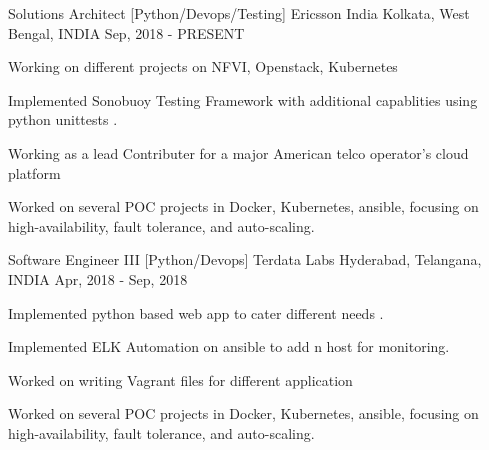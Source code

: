

\begin{cventries}

    \cventry
    {Solutions Architect [Python/Devops/Testing]} %
    {Ericsson India} %
    {Kolkata, West Bengal, INDIA} %
    {Sep, 2018 - PRESENT} %
    {
      \begin{cvitems} %
        \item {Working on different projects on NFVI, Openstack, Kubernetes}
        \item {Implemented Sonobuoy Testing Framework with additional capablities using python unittests .}
        \item {Working as a lead Contributer for a major American telco operator's cloud platform }
        \item {Worked on several POC projects in Docker, Kubernetes, ansible, focusing on high-availability, fault tolerance, and auto-scaling. }
      \end{cvitems}
    }

  \cventry
    {Software Engineer III [Python/Devops]} %
    {Terdata Labs} %
    {Hyderabad, Telangana, INDIA} %
    {Apr, 2018 - Sep, 2018} %
    {
      \begin{cvitems} %
        \item {Implemented python based web app to cater different needs .}
        \item {Implemented ELK Automation on ansible to add n host for monitoring. }
        \item {Worked on writing Vagrant files for different application }
        \item {Worked on several POC projects in Docker, Kubernetes, ansible, focusing on high-availability, fault tolerance, and auto-scaling. }
      \end{cvitems}
    }


\end{cventries}
